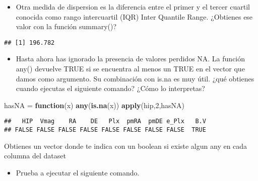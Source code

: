 \documentclass[]{article}
\newenvironment{Shaded}{\begin{snugshade}}{\end{snugshade}}
\newcommand{\KeywordTok}[1]{\textcolor[rgb]{0.13,0.29,0.53}{\textbf{#1}}}
\newcommand{\DecValTok}[1]{\textcolor[rgb]{0.00,0.00,0.81}{#1}}
\newcommand{\StringTok}[1]{\textcolor[rgb]{0.31,0.60,0.02}{#1}}
\newcommand{\ControlFlowTok}[1]{\textcolor[rgb]{0.13,0.29,0.53}{\textbf{#1}}}
\newcommand{\OperatorTok}[1]{\textcolor[rgb]{0.81,0.36,0.00}{\textbf{#1}}}
\newcommand{\NormalTok}[1]{#1}
\providecommand{\tightlist}{%
  \setlength{\itemsep}{0pt}\setlength{\parskip}{0pt}}
\begin{document}
\begin{itemize}
\tightlist
\item
  Otra medida de dispersion es la diferencia entre el primer y el tercer
  cuartil conocida como rango intercuartil (IQR) Inter Quantile Range.
  ¿Obtienes ese valor con la función summary()?
\end{itemize}

\begin{Shaded}
\end{Shaded}

\begin{verbatim}
## [1] 196.782
\end{verbatim}

\begin{itemize}
\tightlist
\item
  Hasta ahora has ignorado la presencia de valores perdidos NA. La
  función any() devuelve TRUE si se encuentra al menos un TRUE en el
  vector que damos como argumento. Su combinación con is.na es muy útil.
  ¿qué obtienes cuando ejecutas el siguiente comando? ¿Cómo lo
  interpretas?
\end{itemize}

\begin{Shaded}
\begin{Highlighting}[]
\NormalTok{hasNA =}\StringTok{ }\ControlFlowTok{function}\NormalTok{(x) }\KeywordTok{any}\NormalTok{(}\KeywordTok{is.na}\NormalTok{(x)) }
\KeywordTok{apply}\NormalTok{(hip,}\DecValTok{2}\NormalTok{,hasNA)   }
\end{Highlighting}
\end{Shaded}

\begin{verbatim}
##   HIP  Vmag    RA    DE   Plx  pmRA  pmDE e_Plx   B.V 
## FALSE FALSE FALSE FALSE FALSE FALSE FALSE FALSE  TRUE
\end{verbatim}

Obtienes un vector donde te indica con un boolean si existe algun any en
cada columna del dataset

\begin{itemize}
\tightlist
\item
  Prueba a ejecutar el siguiente comando.
\end{itemize}
\end{document}
